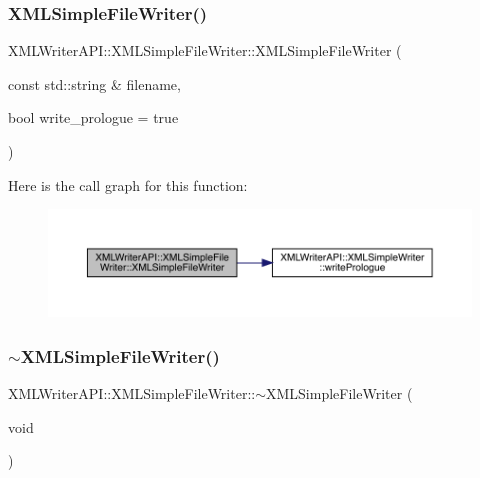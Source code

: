 \subsubsection{\texorpdfstring{XMLSimpleFileWriter()}{XMLSimpleFileWriter()}\hspace{0.1cm}{\footnotesize\ttfamily [2/2]}}
{\footnotesize\ttfamily X\+M\+L\+Writer\+A\+P\+I\+::\+X\+M\+L\+Simple\+File\+Writer\+::\+X\+M\+L\+Simple\+File\+Writer (\begin{DoxyParamCaption}\item[{const std\+::string \&}]{filename,  }\item[{bool}]{write\+\_\+prologue = {\ttfamily true} }\end{DoxyParamCaption})\hspace{0.3cm}{\ttfamily [inline]}}

Here is the call graph for this function\+:
\nopagebreak
\begin{figure}[H]
\begin{center}
\leavevmode
\includegraphics[width=350pt]{d2/de2/classXMLWriterAPI_1_1XMLSimpleFileWriter_a8ce4f6691f7e2e803a14e0cba906a4b7_cgraph}
\end{center}
\end{figure}
\mbox{\label{classXMLWriterAPI_1_1XMLSimpleFileWriter_a8a18cf3ea74f63a4f84a434237109e68}} 
\subsubsection{\texorpdfstring{$\sim$XMLSimpleFileWriter()}{~XMLSimpleFileWriter()}\hspace{0.1cm}{\footnotesize\ttfamily [2/2]}}
{\footnotesize\ttfamily X\+M\+L\+Writer\+A\+P\+I\+::\+X\+M\+L\+Simple\+File\+Writer\+::$\sim$\+X\+M\+L\+Simple\+File\+Writer (\begin{DoxyParamCaption}\item[{void}]{ }\end{DoxyParamCaption})\hspace{0.3cm}{\ttfamily [inline]}}


